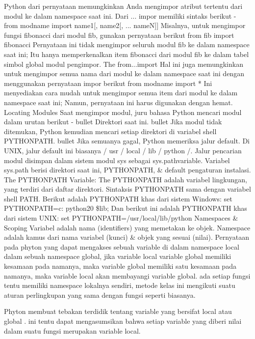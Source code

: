Python dari pernyataan memungkinkan Anda mengimpor atribut tertentu dari modul ke dalam namespace saat ini. Dari ... impor memiliki sintaks berikut - 
from modname import name1[, name2[, ... nameN]] 
Misalnya, untuk mengimpor fungsi fibonacci dari modul fib, gunakan pernyataan berikut 
from fib import fibonacci 
Pernyataan ini tidak mengimpor seluruh modul fib ke dalam namespace saat ini; Itu hanya memperkenalkan item fibonacci dari modul fib ke dalam tabel simbol global modul pengimpor.  
The from...import  
Hal ini juga memungkinkan untuk mengimpor semua nama dari modul ke dalam namespace saat ini dengan menggunakan pernyataan impor berikut 
from modname import * 
Ini menyediakan cara mudah untuk mengimpor semua item dari modul ke dalam namespace saat ini; Namun, pernyataan ini harus digunakan dengan hemat.
Locating Modules
Saat mengimpor modul, juru bahasa Python mencari modul dalam urutan berikut - 
 bullet  Direktori saat ini. 
 bullet Jika modul tidak ditemukan, Python kemudian mencari setiap direktori di variabel shell  PYTHONPATH. 
 bullet Jika semuanya gagal, Python memeriksa jalur default. Di UNIX, jalur default ini   biasanya / usr / local / lib / python /. 
Jalur pencarian modul disimpan dalam sistem modul sys sebagai sys.pathvariable. Variabel sys.path berisi direktori saat ini, PYTHONPATH, \& default pengaturan instalasi.
The  PYTHONPATH  Variable:  
The PYTHONPATH adalah variabel lingkungan, yang terdiri dari daftar direktori. Sintaksis PYTHONPATH sama dengan variabel shell PATH. 
Berikut adalah PYTHONPATH khas dari sistem Windows: 
set PYTHONPATH=c: python20  \$lib;  
Dan berikut ini adalah PYTHONPATH khas dari sistem UNIX: 
  set PYTHONPATH=/usr/local/lib/python  
Namespaces \& Scoping  
Variabel adalah nama (identifiers) yang memetakan ke objek. Namespace adalah kamus dari nama variabel (kunci) \& objek yang sesuai (nilai).  
Pernyataan pada phyton yang dapat mengakses sebuah variable di dalam namespace local  dalam sebuah namespace global, jika variable local  variable global memiliki kesamaan pada namanya, maka variable global memiliki satu kesamaan pada namanya, maka variable local akan membayangi variable global. ada setiap fungsi tentu memiliki namespace lokalnya sendiri, metode kelas ini mengikuti suatu aturan perlingkupan yang sama dengan fungsi seperti biasanya. 

Phyton membuat tebakan terdidik tentang variable yang bersifat local atau global . ini tentu dapat mengasumsikan bahwa setiap variable yang diberi nilai dalam suatu fungsi merupakan variable local.

